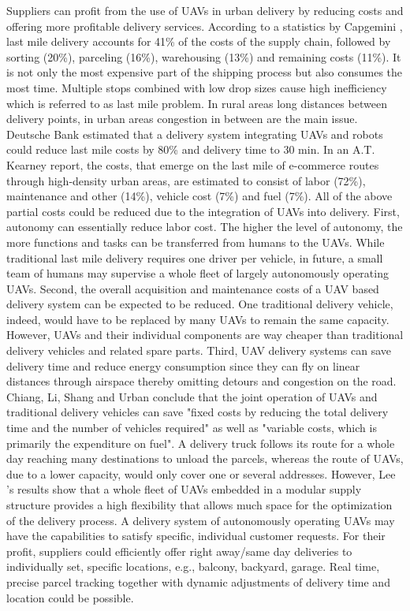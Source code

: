 Suppliers can profit from the use of UAVs in urban delivery by reducing costs and offering more profitable delivery services.
According to a statistics by Capgemini \cite{Jacobs2019}, last mile delivery accounts for 41\% of the costs of the supply chain, 
followed by sorting (20\%), parceling (16\%), warehousing (13\%) and remaining costs (11\%).
It is not only the most expensive part of the shipping process but also consumes the most time. \cite{Dolan2018}
Multiple stops combined with low drop sizes cause high inefficiency which is referred to as last mile problem. \cite{Dolan2018}
In rural areas long distances between delivery points, in urban areas congestion in between are the main issue. \cite{Dolan2018}
Deutsche Bank estimated that a delivery system integrating UAVs and robots could reduce last mile costs by 80\%
and delivery time to 30 min. \cite{Kim2016}
In an A.T. Kearney \cite{Kearney2018} report, the costs, that emerge on the last mile of e-commerce routes through high-density urban areas,
are estimated to consist of labor (72\%), maintenance and other (14\%), vehicle cost (7\%) and fuel (7\%).
All of the above partial costs could be reduced due to the integration of UAVs into delivery.
First, autonomy can essentially reduce labor cost. 
The higher the level of autonomy, the more functions and tasks can be transferred from humans to the UAVs.
While traditional last mile delivery requires one driver per vehicle, 
in future, a small team of humans may supervise a whole fleet of largely autonomously operating UAVs.
Second, the overall acquisition and maintenance costs of a UAV based delivery system can be expected to be reduced.
One traditional delivery vehicle, indeed, would have to be replaced by many UAVs to remain the same capacity.
However, UAVs and their individual components are way cheaper than traditional delivery vehicles and related spare parts.
Third, UAV delivery systems can save delivery time and reduce energy consumption 
since they can fly on linear distances through airspace thereby omitting detours and congestion on the road. 
Chiang, Li, Shang and Urban \cite{Chiang2019} conclude that the joint operation of UAVs and traditional delivery vehicles can save 
"fixed costs by reducing the total delivery time and the number of vehicles required"
as well as "variable costs, which is primarily the expenditure on fuel".
A delivery truck follows its route for a whole day reaching many destinations to unload the parcels,
whereas the route of UAVs, due to a lower capacity, would only cover one or several addresses. 
However, Lee \cite{Lee2017}'s results show that a whole fleet of UAVs embedded in a modular supply structure provides a high flexibility 
that allows much space for the optimization of the delivery process.
A delivery system of autonomously operating UAVs may have the capabilities to satisfy specific, individual customer requests.
For their profit, suppliers could efficiently offer right away/same day deliveries to individually set, specific locations, e.g., balcony, backyard, garage.
Real time, precise parcel tracking together with dynamic adjustments of delivery time and location could be possible.

